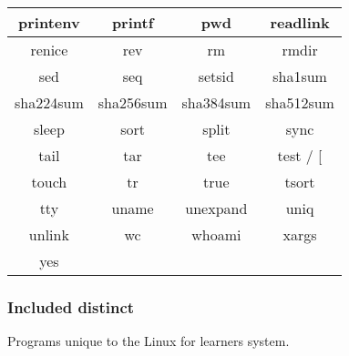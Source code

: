 \begin{itemize}
\begin{center}
\begin{tabular}{|c|c|c|c|}
                printenv & printf & pwd & readlink \\
                \hline
                renice & rev & rm & rmdir \\
                \hline
                sed & seq & setsid & sha1sum \\
                \hline
                sha224sum & sha256sum & sha384sum & sha512sum \\
                \hline
                sleep & sort & split & sync \\
                \hline
                tail & tar & tee & test / [ \\
                \hline
                touch & tr & true & tsort \\
                \hline
                tty & uname & unexpand & uniq \\
                \hline
                unlink & wc & whoami & xargs \\
                \hline
                yes \\
                \cline{1-1}
            \end{tabular}
        \end{center}
\end{itemize}

\subsubsection{Included distinct}

Programs unique to the Linux for learners system.

